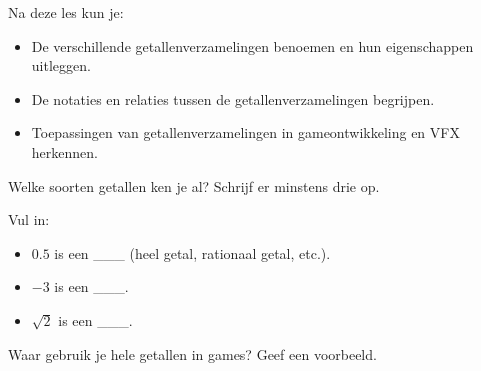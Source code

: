 \documentclass{myximera}
\begin{document}



Na deze les kun je:
\begin{itemize}
    \item De verschillende getallenverzamelingen benoemen en hun eigenschappen uitleggen.
    \item De notaties en relaties tussen de getallenverzamelingen begrijpen.
    \item Toepassingen van getallenverzamelingen in gameontwikkeling en VFX herkennen.
\end{itemize}

\begin{exercise}
\begin{question}
Welke soorten getallen ken je al? Schrijf er minstens drie op.
\end{question}
\begin{question}
Vul in:
\begin{itemize}
    \item \( 0.5 \) is een \_\_\_ (heel getal, rationaal getal, etc.).
    \item \( -3 \) is een \_\_\_.
    \item \( \sqrt{2} \) is een \_\_\_.
\end{itemize}
\end{question}
\begin{question}
Waar gebruik je hele getallen in games? Geef een voorbeeld.
\end{question}
\end{exercise}

\end{document}
